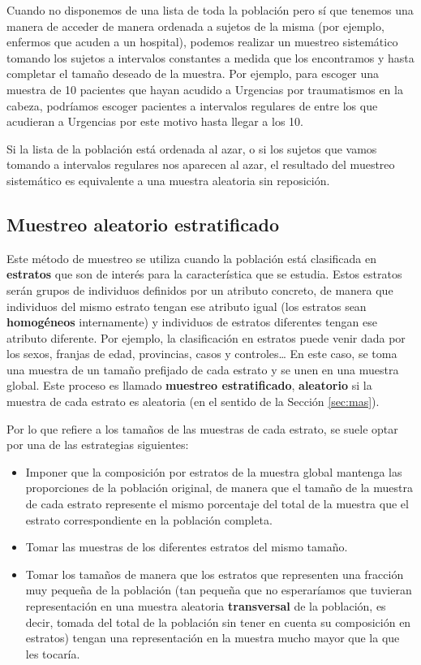 \documentclass[
]{book}
\theoremstyle{definition}
\theoremstyle{definition}
\theoremstyle{definition}
\theoremstyle{definition}
\theoremstyle{remark}
\begin{document}
Cuando no disponemos de una lista de toda la población pero sí que tenemos una manera de acceder de manera ordenada a sujetos de la misma (por ejemplo, enfermos que acuden a un hospital), podemos realizar un muestreo sistemático tomando los sujetos a intervalos constantes a medida que los encontramos y hasta completar el tamaño deseado de la muestra. Por ejemplo, para escoger una muestra de 10 pacientes que hayan acudido a Urgencias por traumatismos en la cabeza, podríamos escoger pacientes a intervalos regulares de entre los que acudieran a Urgencias por este motivo hasta llegar a los 10.

\begin{rmdnote}
Si la lista de la población está ordenada al azar, o si los sujetos que vamos tomando a intervalos regulares nos aparecen al azar, el resultado del muestreo sistemático es equivalente a una muestra aleatoria sin reposición.
\end{rmdnote}

\hypertarget{sec:estr}{%
\subsection{Muestreo aleatorio estratificado}\label{sec:estr}}

Este método de muestreo se utiliza cuando la población está clasificada en \textbf{estratos} que son de interés para la característica que se estudia. Estos estratos serán grupos de individuos definidos por un atributo concreto, de manera que individuos del mismo estrato tengan ese atributo igual (los estratos sean \textbf{homogéneos} internamente) y individuos de estratos diferentes tengan ese atributo diferente. Por ejemplo, la clasificación en estratos puede venir dada por los sexos, franjas de edad, provincias, casos y controles\ldots{} En este caso, se toma una muestra de un tamaño prefijado de cada estrato y se unen en una muestra global. Este proceso es llamado \textbf{muestreo estratificado}, \textbf{aleatorio} si la muestra de cada estrato es aleatoria (en el sentido de la Sección \ref{sec:mas}).

Por lo que refiere a los tamaños de las muestras de cada estrato, se suele optar por una de las estrategias siguientes:

\begin{itemize}
\item
  Imponer que la composición por estratos de la muestra global mantenga las proporciones de la población original, de manera que el tamaño de la muestra de cada estrato represente el mismo porcentaje del total de la muestra que el estrato correspondiente en la población completa.
\item
  Tomar las muestras de los diferentes estratos del mismo tamaño.
\item
  Tomar los tamaños de manera que los estratos que representen una fracción muy pequeña de la población (tan pequeña que no esperaríamos que tuvieran representación en una muestra aleatoria \textbf{transversal} de la población, es decir, tomada del total de la población sin tener en cuenta su composición en estratos) tengan una representación en la muestra mucho mayor que la que les tocaría.
\end{itemize}
\end{document}
